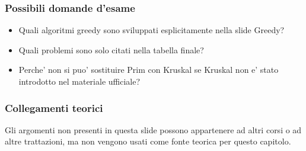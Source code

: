 \subsubsection{Possibili domande d'esame}
\begin{itemize}
	\item Quali algoritmi greedy sono sviluppati esplicitamente nella slide Greedy?
	\item Quali problemi sono solo citati nella tabella finale?
	\item Perche' non si puo' sostituire Prim con Kruskal se Kruskal non e' stato introdotto nel materiale ufficiale?
\end{itemize}

\subsubsection{Collegamenti teorici}
Gli argomenti non presenti in questa slide possono appartenere ad altri corsi o ad altre trattazioni, ma non vengono usati come fonte teorica per questo capitolo.
